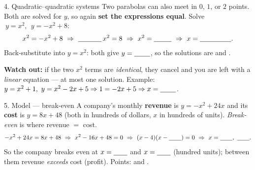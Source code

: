 \documentclass[10pt]{article}
\newcommand{\lgrid}[4]{%
  \draw[step=1, linegray!40, very thin] (#1,#3) grid (#2,#4);
  \draw[->, semithick, charcoal] (#1,0)--(#2,0) node[below right, font=\scriptsize]{$x$};
  \draw[->, semithick, charcoal] (0,#3)--(0,#4) node[left, font=\scriptsize]{$y$};}
\begin{document}
\begin{notesbox}{4. Quadratic--quadratic systems}
Two parabolas can also meet in $0$, $1$, or $2$ points. Both are solved for $y$, so again \textbf{set the
expressions equal}. Solve $\ y=x^2,\ \ y=-x^2+8$:
\[ x^2=-x^2+8\ \Rightarrow\ \blank{1.2cm}\,x^2=8\ \Rightarrow\ x^2=\blank{0.9cm}\ \Rightarrow\ x=\blank{1.6cm}. \]
Back-substitute into $y=x^2$: both give $y=\blank{0.8cm}$, so the solutions are \blank{2.0cm} and \blank{2.0cm}.
\begin{center}
\end{center}
\vspace{-2pt}
\textbf{Watch out:} if the two $x^2$ terms are \emph{identical}, they cancel and you are left with a \emph{linear}
equation --- at most one solution. Example: $y=x^2+1,\ y=x^2-2x+5\Rightarrow 1=-2x+5\Rightarrow x=\blank{0.8cm}$.
\end{notesbox}

\begin{notesbox}{5. Model --- break-even}
A company's monthly \textbf{revenue} is $y=-x^2+24x$ and its \textbf{cost} is $y=8x+48$ (both in hundreds of
dollars, $x$ in hundreds of units). \emph{Break-even} is where revenue $=$ cost.
\[ -x^2+24x=8x+48\ \Rightarrow\ x^2-16x+48=0\ \Rightarrow\ (x-4)(x-\blank{0.7cm})=0\ \Rightarrow\ x=\blank{0.7cm},\ \blank{0.7cm}. \]
So the company breaks even at $x=\blank{0.7cm}$ and $x=\blank{0.7cm}$ (hundred units); between them revenue
\emph{exceeds} cost (profit). Points: \blank{2.4cm} and \blank{2.4cm}.
\end{notesbox}
\end{document}
